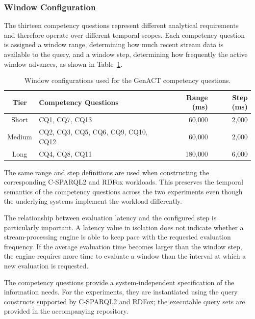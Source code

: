 \subsubsection{Window Configuration}
\label{subsubsec:genact-window-config}

The thirteen competency questions represent different analytical requirements
and therefore operate over different temporal scopes. Each competency question
is assigned a window range, determining how much recent stream data is
available to the query, and a window step, determining how frequently the
active window advances, as shown in Table~\ref{tab:genact-window-tiers}.

\begin{table}[htbp]
\centering
\caption{Window configurations used for the GenACT competency questions.}
\label{tab:genact-window-tiers}
\begin{tabular}{clrr}
\toprule
\textbf{Tier} & \textbf{Competency Questions} &
\textbf{Range (ms)} & \textbf{Step (ms)} \\
\midrule
Short  & CQ1, CQ7, CQ13
            & 60{,}000  & 2{,}000 \\

Medium & CQ2, CQ3, CQ5, CQ6, CQ9, CQ10, CQ12
            & 60{,}000  & 2{,}000 \\

Long   & CQ4, CQ8, CQ11
            & 180{,}000 & 6{,}000 \\
\bottomrule
\end{tabular}
\end{table}

The same range and step definitions are used when constructing the
corresponding C-SPARQL2 and RDFox workloads. This preserves the temporal
semantics of the competency questions across the two experiments even though
the underlying systems implement the workload differently.

The relationship between evaluation latency and the configured step is
particularly important. A latency value in isolation does not indicate whether
a stream-processing engine is able to keep pace with the requested evaluation
frequency. If the average evaluation time becomes larger than the window step,
the engine requires more time to evaluate a window than the interval at which a
new evaluation is requested.

The competency questions provide a system-independent specification of the
information needs. For the experiments, they are instantiated using the query
constructs supported by C-SPARQL2 and RDFox; the executable query sets are
provided in the accompanying repository.

